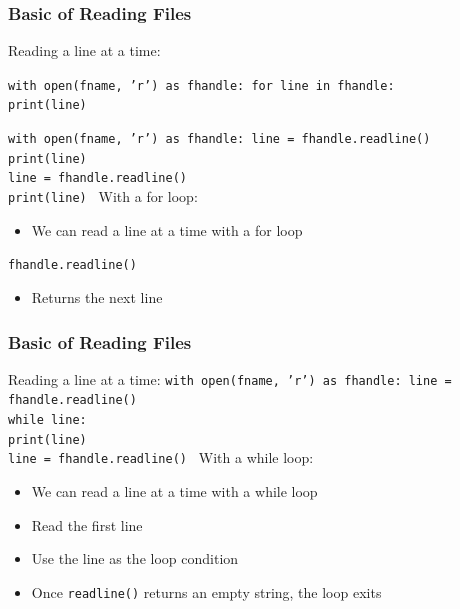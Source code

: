 \documentclass{beamer}
\newcommand{\code}[1]{\texttt{#1}}
\newcommand{\tab}{\hspace*{22pt}}
\begin{document}
\begin{frame}	
	\frametitle{Basic of Reading Files}
	
	\begin{block}{Reading a line at a time:}
			\vspace{30pt}
			
			\code{with open(fname, 'r') as fhandle:
					\tab for line in fhandle: \\
					\tab \tab print(line)
			}
			
			\vspace{30pt}
			\code{with open(fname, 'r') as fhandle:
					\tab line = fhandle.readline() \\
					\tab print(line) \\
					\tab line = fhandle.readline() \\
					\tab print(line)
			}
		\endminipage\hfill
		\endminipage\hfill
			With a for loop:
			\begin{itemize}
				\item We can read a line at a time with a for loop
			\end{itemize}
			
			\vspace{20pt}
			\code{fhandle.readline()}
			\begin{itemize}
				\item Returns the next line
			\end{itemize}
		\endminipage\hfill
	\end{block}
	
\end{frame}

\begin{frame}	
	\frametitle{Basic of Reading Files}
	
	\begin{block}{Reading a line at a time:}
			\code{with open(fname, 'r') as fhandle:
					\tab line = fhandle.readline() \\
					\tab while line: \\
					\tab \tab print(line) \\
					\tab \tab line = fhandle.readline()
			}
		\endminipage\hfill
		\endminipage\hfill
			With a while loop:
			\begin{itemize}
				\item We can read a line at a time with a while loop
				\item Read the first line
				\item Use the line as the loop condition
				\item Once \code{readline()} returns an empty string, the loop exits
			\end{itemize}
		\endminipage\hfill
	\end{block}
	
\end{frame}
\end{document}
